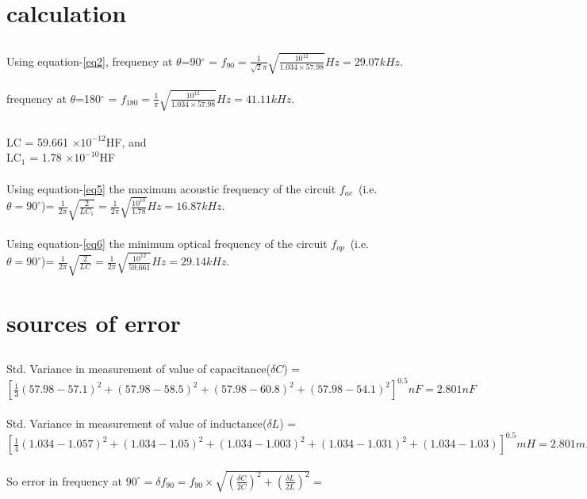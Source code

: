 \section{calculation}
\subsection{\up{\m}}
Using equation-\eqref{eq2},
frequency at $\theta$=90$^{\circ}$ = $f_{90}= \frac{1}{\sqrt{2}\pi}\sqrt{\frac{10^12}{1.034\times 57.98}}Hz=29.07kHz.$\\ \\
 
frequency at $\theta$=180$^{\circ}$ = $f_{180}= \frac{1}{\pi}\sqrt{\frac{10^12}{1.034\times 57.98}}Hz=41.11kHz.$
\subsection{\up{\d}}
\noindent LC = 59.661 $\times 10^{-12}$HF, and\\
 LC$_1$ = 1.78 $\times 10^{-10}$HF\\ \\
Using equation-\eqref{eq5} the maximum acoustic frequency of the circuit $f_{ac}$\ (i.e. $\theta=90^{\circ}$)= $\frac{1}{2\pi}\sqrt{\frac{2}{LC_1}}=\frac{1}{2\pi}\sqrt{\frac{10^{10}}{1.78}}Hz=16.87kHz.$\\ \\

Using equation-\eqref{eq6} the minimum optical frequency of the circuit $f_{op}$\ (i.e. $\theta=90^{\circ}$)= $\frac{1}{2\pi}\sqrt{\frac{2}{LC}}=\frac{1}{2\pi}\sqrt{\frac{10^{12}}{59.661}}Hz=29.14kHz.$
\section{sources of error}
\subsection{\up{\m}}
Std. Variance in measurement of value of capacitance($\delta C$) = $[\frac{1}{3}(57.98-57.1)^2+(57.98-58.5)^2+ (57.98-60.8)^2+(57.98-54.1)^2]^{0.5}nF=2.801nF$\\ \\
Std. Variance in measurement of value of inductance($\delta L$) = $[\frac{1}{4}(1.034-1.057)^2+(1.034-1.05)^2+(1.034-1.003)^2+(1.034-1.031)^2+(1.034-1.03)]^{0.5}mH=2.801mH$\\ \\
So error in frequency at $90^{\circ}=\delta f_{90}=f_{90}\times \sqrt{\left( \frac{\delta C}{2C}\right)^2+\left(\frac{\delta L}{2L}\right)^2}=$   \\ \\

